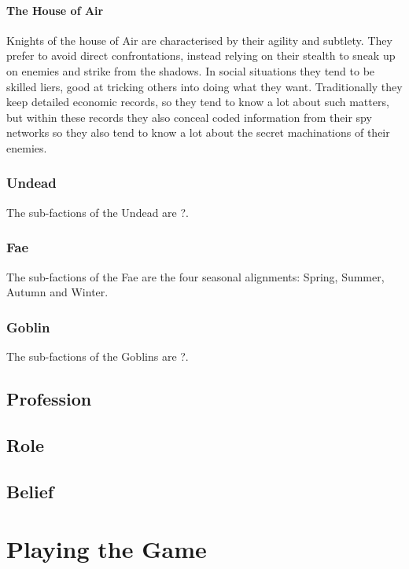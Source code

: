 \documentclass{report}
\begin{document}
\subsubsection{The House of Air}
Knights of the house of Air are characterised by their agility and subtlety. They prefer to avoid direct confrontations,
instead relying on their stealth to sneak up on enemies and strike from the shadows. In social situations they tend to be
skilled liers, good at tricking others into doing what they want. Traditionally they keep detailed economic records, so
they tend to know a lot about such matters, but within these records they also conceal coded information from their spy
networks so they also tend to know a lot about the secret machinations of their enemies.

\subsection{Undead}
The sub-factions of the Undead are ?.

\subsection{Fae}
The sub-factions of the Fae are the four seasonal alignments: Spring, Summer, Autumn and Winter.

\subsection{Goblin}
The sub-factions of the Goblins are ?.


\section{Profession}

\section{Role}

\section{Belief}

\chapter{Playing the Game}
\end{document}

